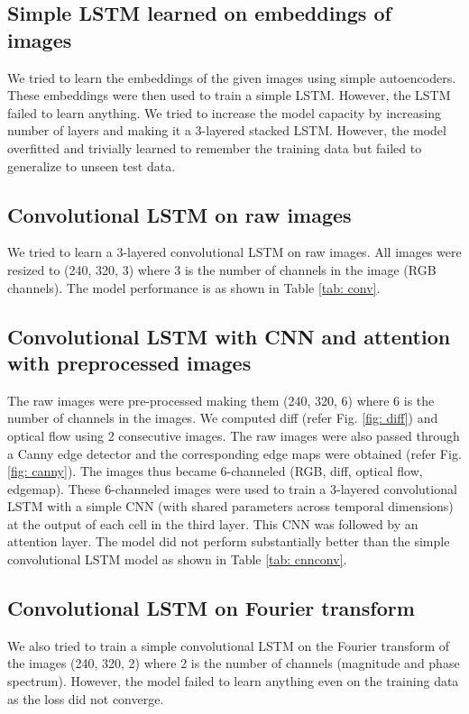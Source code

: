 \documentclass[journal]{IEEEtran}
\begin{document}
\subsection{Simple LSTM learned on embeddings of images}
We tried to learn the embeddings of the given images using simple autoencoders. These embeddings were then used to train a simple LSTM. However, the LSTM failed to learn anything. We tried to increase the model capacity by increasing number of layers and making it a 3-layered stacked LSTM. However, the model overfitted and trivially learned to remember the training data but failed to generalize to unseen test data.

\subsection{Convolutional LSTM on raw images}
We tried to learn a 3-layered convolutional LSTM on raw images. All images were resized to (240, 320, 3) where 3 is the number of channels in the image (RGB channels). The model performance is as shown in Table \ref{tab: conv}.

\subsection{Convolutional LSTM with CNN and attention with preprocessed images}
The raw images were pre-processed making them (240, 320, 6) where 6 is the number of channels in the images. We computed diff (refer Fig. \ref{fig: diff}) and optical flow using 2 consecutive images. The raw images were also passed through a Canny edge detector and the corresponding edge maps were obtained (refer Fig. \ref{fig: canny}). The images thus became 6-channeled (RGB, diff, optical flow, edgemap). These 6-channeled images were used to train a 3-layered convolutional LSTM with a simple CNN (with shared parameters across temporal dimensions) at the output of each cell in the third layer. This CNN was followed by an attention layer. The model did not perform substantially better than the simple convolutional LSTM model as shown in Table \ref{tab: cnnconv}.

\subsection{Convolutional LSTM on Fourier transform}
We also tried to train a simple convolutional LSTM on the Fourier transform of the images (240, 320, 2) where 2 is the number of channels (magnitude and phase spectrum). However, the model failed to learn anything even on the training data as the loss did not converge.
\end{document}
